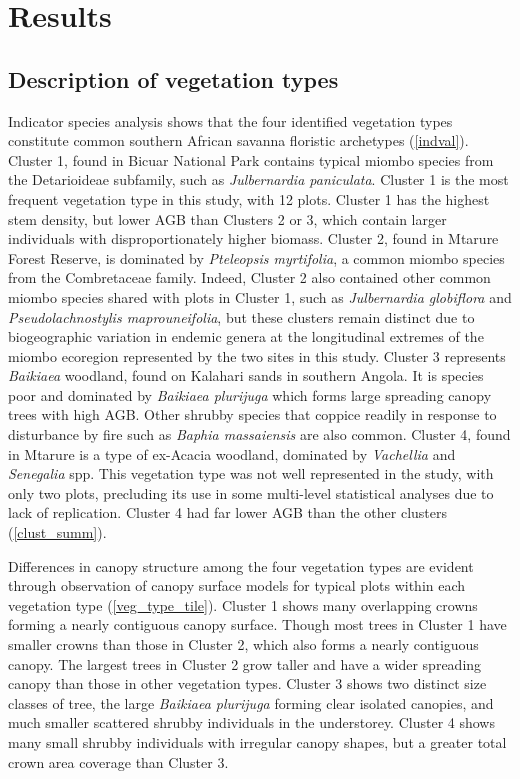 \documentclass[11pt,a4paper]{article}
\begin{document}




\section{Results}

\subsection{Description of vegetation types}

Indicator species analysis shows that the four identified vegetation types constitute common southern African savanna floristic archetypes (\autoref{indval}). Cluster 1, found in Bicuar National Park contains typical miombo species from the Detarioideae subfamily, such as \textit{Julbernardia paniculata}. Cluster 1 is the most frequent vegetation type in this study, with 12 plots. Cluster 1 has the highest stem density, but lower AGB than Clusters 2 or 3, which contain larger individuals with disproportionately higher biomass. Cluster 2, found in Mtarure Forest Reserve, is dominated by \textit{Pteleopsis myrtifolia}, a common miombo species from the Combretaceae family. Indeed, Cluster 2 also contained other common miombo species shared with plots in Cluster 1, such as \textit{Julbernardia globiflora} and \textit{Pseudolachnostylis maprouneifolia}, but these clusters remain distinct due to biogeographic variation in endemic genera at the longitudinal extremes of the miombo ecoregion represented by the two sites in this study. Cluster 3 represents \textit{Baikiaea} woodland, found on Kalahari sands in southern Angola. It is species poor and dominated by \textit{Baikiaea plurijuga} which forms large spreading canopy trees with high AGB. Other shrubby species that coppice readily in response to disturbance by fire such as \textit{Baphia massaiensis} are also common. Cluster 4, found in Mtarure is a type of ex-Acacia woodland, dominated by \textit{Vachellia} and \textit{Senegalia} spp. This vegetation type was not well represented in the study, with only two plots, precluding its use in some multi-level statistical analyses due to lack of replication. Cluster 4 had far lower AGB than the other clusters (\autoref{clust_summ}). 

Differences in canopy structure among the four vegetation types are evident through observation of canopy surface models for typical plots within each vegetation type (\autoref{veg_type_tile}). Cluster 1 shows many overlapping crowns forming a nearly contiguous canopy surface. Though most trees in Cluster 1 have smaller crowns than those in Cluster 2, which also forms a nearly contiguous canopy. The largest trees in Cluster 2 grow taller and have a wider spreading canopy than those in other vegetation types. Cluster 3 shows two distinct size classes of tree, the large \textit{Baikiaea plurijuga} forming clear isolated canopies, and much smaller scattered shrubby individuals in the understorey. Cluster 4 shows many small shrubby individuals with irregular canopy shapes, but a greater total crown area coverage than Cluster 3. 
\end{document}
